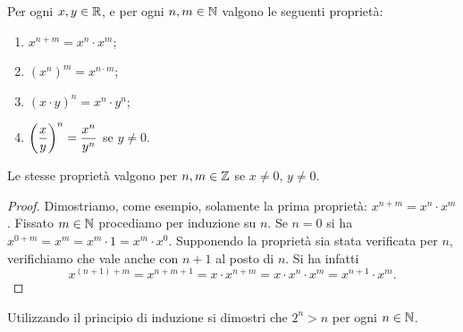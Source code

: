 \begin{theorem}
Per ogni $x,y\in \mathbb R$, e per ogni $n,m \in \mathbb N$
valgono le seguenti proprietà:
\begin{enumerate}
  \item  $x^{n+m} = x^n \cdot x^m$;
  \item $(x^n)^m = x^{n\cdot m}$;
  \item $(x\cdot y)^n = x^n \cdot y^n$;
  \item $\displaystyle {\left( \frac{x}{y} \right)}^n = \frac{x^n}{y^n}$ se $y\neq 0$.
\end{enumerate}
Le stesse proprietà valgono per $n,m \in\mathbb Z$ se $x\neq 0$, $y\neq 0$.
\end{theorem}
%
\begin{proof}
Dimostriamo, come esempio, solamente la prima proprietà: $x^{n+m} = x^n \cdot x^m$.
Fissato $m\in \mathbb N$ procediamo per induzione su $n$.
Se $n=0$ si ha $x^{0+m} = x^m = x^m \cdot 1 = x^m \cdot x^0$.
Supponendo la proprietà sia stata verificata per $n$, verifichiamo
che vale anche con $n+1$ al posto di $n$. Si ha infatti
\[
 x^{(n+1)+m} = x^{n+m+1} = x \cdot x^{n+m} = x \cdot x^n \cdot x^m
  = x^{n+1} \cdot x^m.
\]
\end{proof}

\begin{exercise}
Utilizzando il principio di induzione
si dimostri che $2^n > n$ per ogni $n\in \mathbb N$.
\end{exercise}

